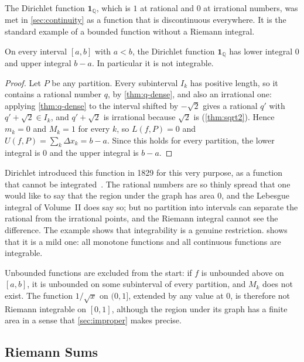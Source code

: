 The Dirichlet function $\mathbf 1_{\mathbb Q}$, which is $1$ at rational and $0$ at irrational numbers, was met in \cref{sec:continuity} as a function that is discontinuous everywhere. It is the standard example of a bounded function without a Riemann integral.

\begin{proposition}
\label{prop:dirichlet}
On every interval $[a,b]$ with $a<b$, the Dirichlet function $\mathbf 1_{\mathbb Q}$ has lower integral $0$ and upper integral $b-a$. In particular it is not integrable.
\end{proposition}

\begin{proof}
Let $P$ be any partition. Every subinterval $I_k$ has positive length, so it contains a rational number $q$, by \cref{thm:q-dense}, and also an irrational one: applying \cref{thm:q-dense} to the interval shifted by $-\sqrt2$ gives a rational $q'$ with $q'+\sqrt2\in I_k$, and $q'+\sqrt2$ is irrational because $\sqrt2$ is (\cref{thm:sqrt2}). Hence $m_k=0$ and $M_k=1$ for every $k$, so $L(f,P)=0$ and $U(f,P)=\sum_k\Delta x_k=b-a$. Since this holds for every partition, the lower integral is $0$ and the upper integral is $b-a$.
\end{proof}

Dirichlet introduced this function in 1829 for this very purpose, as a function that cannot be integrated~\cite{dirichlet1829}. The rational numbers are so thinly spread that one would like to say that the region under the graph has area $0$, and the Lebesgue integral of Volume~II does say so; but no partition into intervals can separate the rational from the irrational points, and the Riemann integral cannot see the difference. The example shows that integrability is a genuine restriction.  shows that it is a mild one: all monotone functions and all continuous functions are integrable.

Unbounded functions are excluded from the start: if $f$ is unbounded above on $[a,b]$, it is unbounded on some subinterval of every partition, and $M_k$ does not exist. The function $1/\sqrt x$ on $(0,1]$, extended by any value at $0$, is therefore not Riemann integrable on $[0,1]$, although the region under its graph has a finite area in a sense that \cref{sec:improper} makes precise.

\subsection{Riemann Sums}

